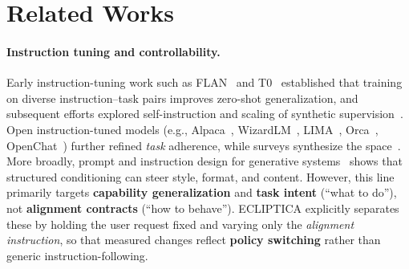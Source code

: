 \vspace{-3mm}
\section{Related Works}
\label{sec:appendix_related}

\paragraph{Instruction tuning and controllability.}
Early instruction-tuning work such as FLAN~\cite{wei2022finetuned,chung2022scaling,longpre2023flan} and T0~\cite{sanh2022multitask} established that training on diverse instruction--task pairs improves zero-shot generalization, and subsequent efforts explored self-instruction and scaling of synthetic supervision~\cite{wang2023self,iyer2022opt,mishra2022cross}. Open instruction-tuned models (e.g., Alpaca~\cite{taori2023alpaca}, WizardLM~\cite{xu2023wizardlm}, LIMA~\cite{zhou2023lima}, Orca~\cite{mukherjee2023orca}, OpenChat~\cite{wang2023openchat}) further refined \emph{task} adherence, while surveys synthesize the space~\cite{peng2023instruction}. More broadly, prompt and instruction design for generative systems~\cite{yang2023prompt} shows that structured conditioning can steer style, format, and content. However, this line primarily targets \textbf{capability generalization} and \textbf{task intent} (``what to do''), not \textbf{alignment contracts} (``how to behave''). ECLIPTICA explicitly separates these by holding the user request fixed and varying only the \emph{alignment instruction}, so that measured changes reflect \textbf{policy switching} rather than generic instruction-following.

